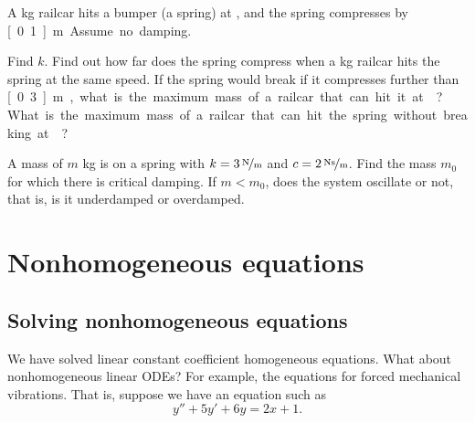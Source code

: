 \pagebreak[2]
\begin{exercise}
A \unit[5000]{kg} railcar hits a bumper (a spring) at ,
and the spring compresses by \unit[0.1]{m}.  Assume no damping.
\begin{tasks}
\task Find $k$.
\task Find out how far does the spring compress when a
\unit[10000]{kg} railcar hits the spring at the same speed.
\task If the spring
would break if it compresses further than \unit[0.3]{m}, what is the maximum
mass of a railcar that can hit it at ?
\task What is
the maximum mass of a railcar that can hit the spring without breaking
at ?
\end{tasks}
\end{exercise}

\begin{exercise}
A mass of $m$ \unit{kg} is on a spring with $k=\unitfrac[3]{N}{m}$ and
$c=\unitfrac[2]{Ns}{m}$.  Find the mass $m_0$ for which there is critical
damping.  If $m < m_0$, does the system oscillate or not, that is, is it
underdamped or overdamped.
\end{exercise}


\sectionnewpage
\section{Nonhomogeneous equations}
\label{sec:nonhom}


\subsection{Solving nonhomogeneous equations}

We have solved linear constant coefficient homogeneous 
equations.
What about nonhomogeneous linear ODEs?
For example, the equations for forced mechanical vibrations.
That is, suppose we have an equation such as
\begin{equation} \label{eq3.5:nh}
y'' + 5y'+ 6y = 2x+1 .
\end{equation}

